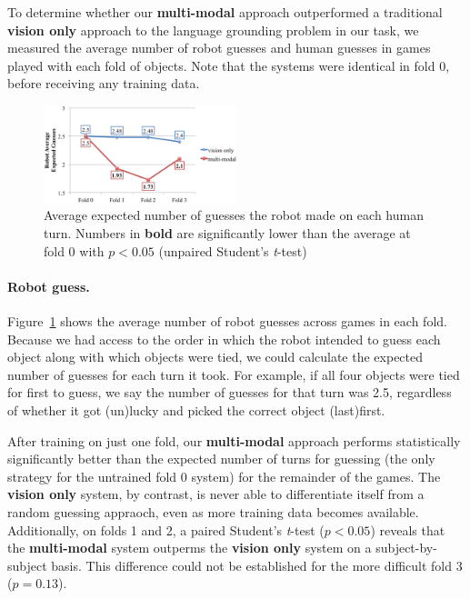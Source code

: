 To determine whether our \textbf{multi-modal} approach outperformed a traditional \textbf{vision only} approach to the language grounding problem in our \ispy task, we measured the average number of robot guesses and human guesses in games played with each fold of objects. Note that the systems were identical in fold 0, before receiving any training data.

\begin{figure}
\centering
\includegraphics[width=0.5\textwidth]{figures/robot_guesses.png}
\caption{Average expected number of guesses the robot made on each human turn. Numbers in \textbf{bold} are significantly lower than the average at fold 0 with $p<0.05$ (unpaired Student's \textit{t}-test)}
\label{fig:robot_guesses}
\end{figure}

\paragraph{Robot guess.}
Figure~\ref{fig:robot_guesses} shows the average number of robot guesses across games in each fold. Because we had access to the order in which the robot intended to guess each object along with which objects were tied, we could calculate the expected number of guesses for each turn it took.
For example, if all four objects were tied for first to guess, we say the number of guesses for that turn was 2.5, regardless of whether it got (un)lucky and picked the correct object (last)first.

After training on just one fold, our \textbf{multi-modal} approach performs statistically significantly better than the expected number of turns for guessing (the only strategy for the untrained fold 0 system) for the remainder of the games.
The \textbf{vision only} system, by contrast, is never able to differentiate itself from a random guessing appraoch, even as more training data becomes available.
Additionally, on folds 1 and 2, a paired Student's \textit{t}-test ($p<0.05$) reveals that the \textbf{multi-modal} system outperms the \textbf{vision only} system on a subject-by-subject basis.
This difference could not be established for the more difficult fold 3 ($p=0.13$).


